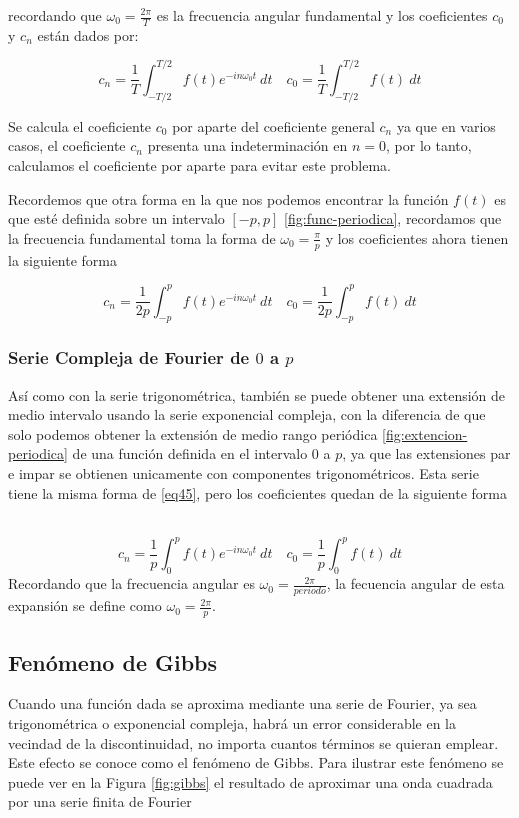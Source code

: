 recordando que $\omega_0 = \frac{2\pi}{T}$ es la frecuencia angular fundamental y los coeficientes $c_0$ y $c_n$ están dados por: 

\begin{equation}\label{eq43}
	c_n = \frac{1}{T} \int_{-T/2}^{T/2} f(t) e^{-i n \omega_0 t} \ dt \quad c_0 = \frac{1}{T} \int_{-T/2}^{T/2} f(t)\ dt 
\end{equation}

Se calcula el coeficiente $c_0$ por aparte del coeficiente general $c_n$ ya que en varios casos, el coeficiente $c_n$ presenta una indeterminación en $n=0$, por lo tanto, calculamos el coeficiente por aparte para evitar este problema.\newline

Recordemos que otra forma en la que nos podemos encontrar la función $f(t)$ es que esté definida sobre un intervalo $[-p, p]$ \ref{fig:func-periodica}, recordamos que la frecuencia fundamental toma la forma de $\omega_0 = \frac{\pi}{p}$ y los coeficientes ahora tienen la siguiente forma

\begin{equation}\label{eq44}
	c_n = \frac{1}{2p} \int_{-p}^{p} f(t) e^{-i n \omega_0 t} \ dt \quad c_0 = \frac{1}{2p} \int_{-p}^{p} f(t)\ dt 
\end{equation}

\subsubsection{Serie Compleja de Fourier de $0$ a $p$}
Así como con la serie trigonométrica, también se puede obtener una extensión de medio intervalo usando la serie exponencial compleja, con la diferencia de que solo podemos obtener la extensión de medio rango periódica \ref{fig:extencion-periodica} de una función definida en el intervalo $0$ a $p$, ya que las extensiones par e impar se obtienen unicamente con componentes trigonométricos. Esta serie tiene la misma forma de \eqref{eq45}, pero los coeficientes quedan de la siguiente forma ~\cite{fourierCinvestav}

\begin{equation}\label{eq46}
	c_n = \frac{1}{p} \int_{0}^{p} f(t) e^{-i n \omega_0 t} \ dt \quad c_0 = \frac{1}{p} \int_{0}^{p} f(t)\ dt 
\end{equation}
Recordando que la frecuencia angular es $\omega_0 = \frac{2\pi}{periodo}$, la fecuencia angular de esta expansión se define como $\omega_0 = \frac{2\pi}{p}$.
\subsection{Fenómeno de Gibbs}
Cuando una función dada se aproxima mediante una serie de Fourier, ya sea trigonométrica o exponencial compleja, habrá un error considerable en la vecindad de la discontinuidad, no importa cuantos términos se quieran emplear. Este efecto se conoce como el fenómeno de Gibbs. Para ilustrar este fenómeno se puede ver en la Figura \ref{fig:gibbs} el resultado de aproximar una onda cuadrada por una serie finita de Fourier ~\cite{fourierCarrillo}


